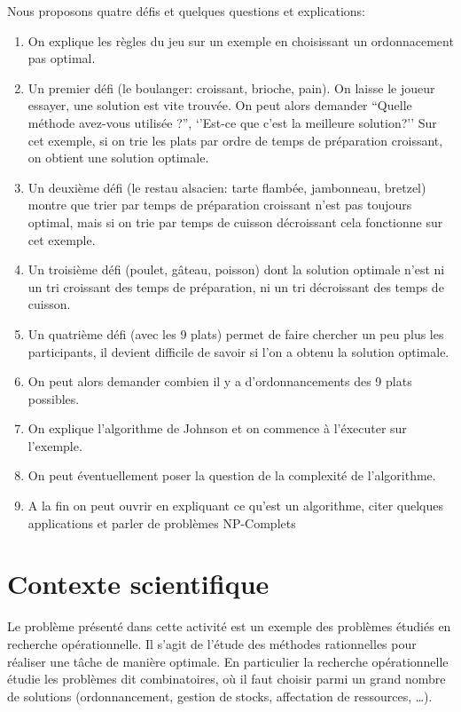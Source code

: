 \documentclass[a4paper]{article}
\begin{document}
Nous proposons quatre défis et quelques questions et explications:
\begin{enumerate}
\item On explique les règles du jeu sur un exemple en choisissant un ordonnacement pas optimal.
\item Un premier défi (le boulanger: croissant, brioche, pain). On laisse le joueur essayer, une solution est vite trouvée. On peut alors demander ``Quelle méthode avez-vous utilisée ?'', `'Est-ce que c'est la meilleure solution?''
Sur cet exemple, si on trie les plats par ordre de temps de préparation croissant, on obtient une solution optimale. 
\item Un deuxième défi (le restau alsacien: tarte flambée, jambonneau, bretzel) montre que trier par temps de préparation croissant n'est pas toujours optimal, mais si on trie par temps de cuisson décroissant cela fonctionne sur cet exemple.
\item Un troisième défi (poulet, gâteau, poisson) dont la solution optimale n'est ni un tri croissant des temps de préparation, ni un tri décroissant des temps de cuisson.
\item Un quatrième défi (avec les 9 plats) permet de faire chercher un peu plus les participants, il devient difficile de savoir si l'on a obtenu la solution optimale.
\item On peut alors demander combien il y a d'ordonnancements des 9 plats possibles.
\item On explique l'algorithme de Johnson et on commence à l'éxecuter sur l'exemple.
\item On peut éventuellement poser la question de la complexité de l'algorithme.
\item A la fin on peut ouvrir en expliquant ce qu'est un algorithme, citer quelques applications et parler de problèmes NP-Complets 
\end{enumerate}

\section{Contexte scientifique}


Le problème présenté dans cette activité est un exemple des problèmes étudiés en recherche opérationnelle. Il s'agit de l'étude des méthodes rationnelles pour réaliser une tâche de manière optimale. En particulier la recherche opérationnelle étudie les problèmes dit combinatoires, où il faut choisir parmi un grand nombre de solutions (ordonnancement, gestion de stocks, affectation de ressources, \ldots ).
\end{document}
